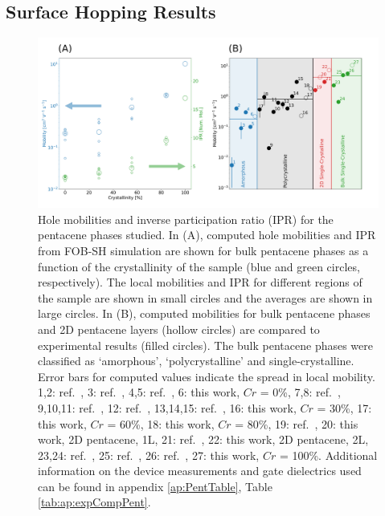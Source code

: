 \subsection{Surface Hopping Results}
\begin{figure}[htp] 
  \includegraphics[width=\textwidth]{../img/DifferentQuenchTimes/mobilities.png}
  \caption{\label{fig:mobilities}Hole mobilities and inverse participation ratio (IPR) for the pentacene phases studied.  
 In (A), computed hole mobilities and IPR from FOB-SH simulation are shown for bulk pentacene phases 
 as a function of the crystallinity of the sample (blue and green circles, respectively). The local mobilities and IPR for different regions of the sample are shown in 
	small circles and the averages are shown in large circles. In (B), computed mobilities for bulk pentacene phases and 2D pentacene layers (hollow circles) 
	are compared to experimental results (filled circles). The bulk pentacene phases were classified as `amorphous', `polycrystalline' and single-crystalline. 
 Error bars for computed values indicate the spread in local mobility.  
 1,2: ref.~\cite{AmorphPentPumpProbe}, 
 3: ref.~\cite{BAE201398}, 
 4,5: ref.~\cite{AmorphPentTransportDodgy},
 6: this work, $Cr$ = 0\%,
 7,8: ref.~\cite{KNIPP2004595},
 9,10,11: ref.~\cite{Fritz2005},
 12: ref.~\cite{Duffy2008}, 
 13,14,15: ref.~\cite{Klauk02},
 16: this work, $Cr$ = 30\%,
 17: this work, $Cr$ = 60\%,
 18:  this work,  $Cr$ = 80\%,
 19: ref.~\cite{Zhang2016TF},
  20: this work, 2D pentacene, 1L,
 21: ref.~\cite{Zhang2016TF},
 22:  this work, 2D pentacene, 2L,
 23,24: ref.~\cite{Lee2006}, 
 25: ref.~\cite{Takeyama2012_PentCryst},
 26: ref.~\cite{Arabi2016},
 27: this work, $Cr$ = 100\%.  
	Additional information on the device measurements and gate dielectrics used can be found in appendix \ref{ap:PentTable}, Table \ref{tab:ap:expCompPent}.}
\end{figure}
